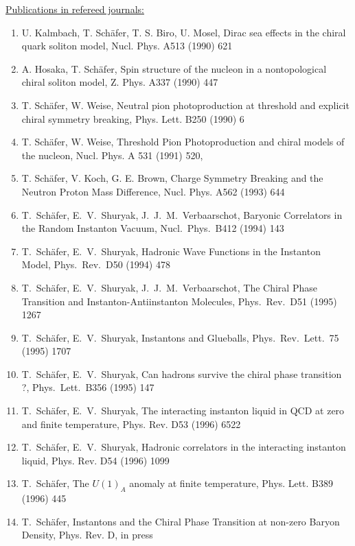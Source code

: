\underline{Publications in refereed journals:}
\begin{enumerate}

\item{U. Kalmbach, T. Sch\"afer, T. S. Biro, U. Mosel,  Dirac sea effects in
the chiral quark soliton model, Nucl. Phys. A513 (1990) 621 }

\item{A. Hosaka, T. Sch\"afer, Spin structure of the nucleon in a
 nontopological chiral soliton model, Z. Phys. A337 (1990) 447}

\item{T. Sch\"afer, W. Weise, Neutral pion photoproduction at threshold and
explicit chiral symmetry breaking, Phys. Lett. B250 (1990) 6 }

\item{T. Sch\"afer, W. Weise, Threshold Pion Photoproduction and chiral
models of the nucleon, Nucl. Phys. A 531 (1991) 520, }

\item{T. Sch\"afer, V. Koch, G. E. Brown, Charge Symmetry Breaking
and the Neutron Proton Mass Difference, Nucl. Phys. A562 (1993) 644}

\item{T.~Sch\"afer, E.~V.~Shuryak, J.~J.~M.~Verbaarschot, Baryonic
Correlators in the Random Instanton Vacuum, Nucl.~Phys.~B412 (1994) 143}

\item{T.~Sch\"afer, E.~V.~Shuryak, Hadronic Wave Functions in the
Instanton Model, Phys.~Rev.~D50 (1994) 478}

\item{T.~Sch\"afer, E.~V.~Shuryak, J.~J.~M.~Verbaarschot, The Chiral
Phase Transition and Instanton-Antiinstanton Molecules, Phys.~Rev.~D51
(1995) 1267}

\item{T.~Sch\"afer, E.~V.~Shuryak, Instantons and Glueballs, 
Phys.~Rev.~Lett.~75 (1995) 1707}

\item{T.~Sch\"afer, E.~V.~Shuryak, Can hadrons survive the chiral phase
transition ?,  Phys.~Lett.~B356 (1995) 147}

\item{T.~Sch\"afer, E.~V.~Shuryak, The interacting instanton liquid in
QCD at zero and finite temperature, Phys. Rev. D53 (1996) 6522}

\item{T.~Sch\"afer, E.~V.~Shuryak, Hadronic correlators in the 
interacting instanton liquid, Phys. Rev. D54 (1996) 1099}

\item{T.~Sch\"afer, The $U(1)_A$ anomaly at finite temperature,
Phys. Lett. B389 (1996) 445}

\item{T.~Sch\"afer, Instantons and the Chiral Phase Transition
at non-zero Baryon Density, Phys. Rev. D, in press}

\setcounter{myitem}{\value{enumi}}
\end{enumerate}


